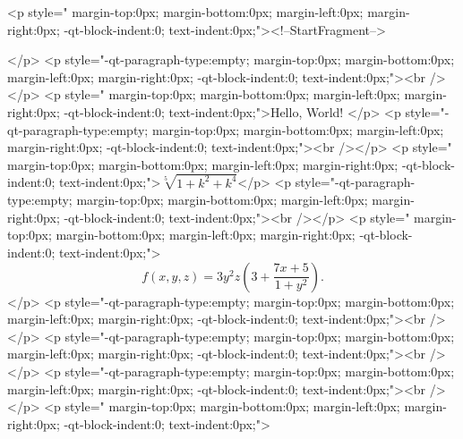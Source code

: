 <p style=" margin-top:0px; margin-bottom:0px; margin-left:0px; margin-right:0px; -qt-block-indent:0; text-indent:0px;"><!--StartFragment-->\documentclass{ctexart}</p>
\begin{document}
 </p>
<p style="-qt-paragraph-type:empty; margin-top:0px; margin-bottom:0px; margin-left:0px; margin-right:0px; -qt-block-indent:0; text-indent:0px;"><br /></p>
<p style=" margin-top:0px; margin-bottom:0px; margin-left:0px; margin-right:0px; -qt-block-indent:0; text-indent:0px;">Hello, World! </p>
<p style="-qt-paragraph-type:empty; margin-top:0px; margin-bottom:0px; margin-left:0px; margin-right:0px; -qt-block-indent:0; text-indent:0px;"><br /></p>
<p style=" margin-top:0px; margin-bottom:0px; margin-left:0px; margin-right:0px; -qt-block-indent:0; text-indent:0px;">$\sqrt[5]{1+k^2+k^4}$</p>
<p style="-qt-paragraph-type:empty; margin-top:0px; margin-bottom:0px; margin-left:0px; margin-right:0px; -qt-block-indent:0; text-indent:0px;"><br /></p>
<p style=" margin-top:0px; margin-bottom:0px; margin-left:0px; margin-right:0px; -qt-block-indent:0; text-indent:0px;">\[f(x,y,z) = 3y^2 z \left(3 + \frac{7x+5}{1+y^2}\right).\]</p>
<p style="-qt-paragraph-type:empty; margin-top:0px; margin-bottom:0px; margin-left:0px; margin-right:0px; -qt-block-indent:0; text-indent:0px;"><br /></p>
<p style="-qt-paragraph-type:empty; margin-top:0px; margin-bottom:0px; margin-left:0px; margin-right:0px; -qt-block-indent:0; text-indent:0px;"><br /></p>
<p style="-qt-paragraph-type:empty; margin-top:0px; margin-bottom:0px; margin-left:0px; margin-right:0px; -qt-block-indent:0; text-indent:0px;"><br /></p>
<p style=" margin-top:0px; margin-bottom:0px; margin-left:0px; margin-right:0px; -qt-block-indent:0; text-indent:0px;">
\end{document}
